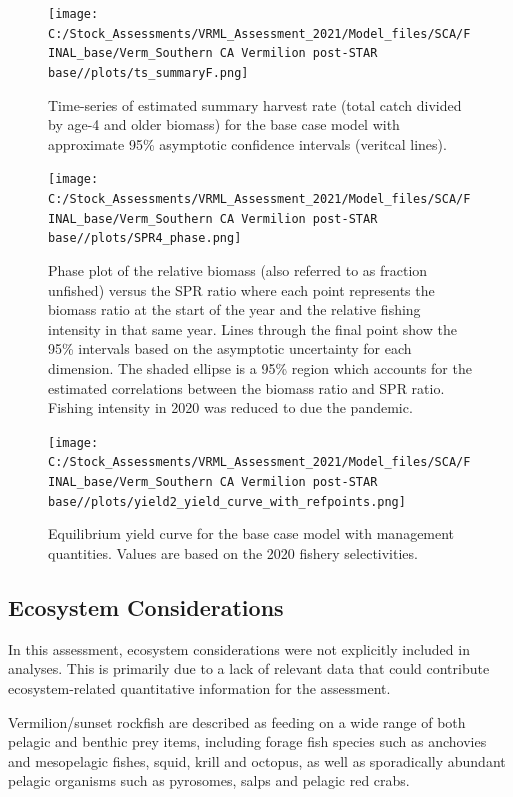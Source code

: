 \documentclass[
  english,
  a4paper,
]{article}
\begin{document}
\begin{figure}
\centering
\texttt{[image: C:/Stock\_Assessments/VRML\_Assessment\_2021/Model\_files/SCA/FINAL\_base/Verm\_Southern CA Vermilion post-STAR base//plots/ts\_summaryF.png]}
\caption{Time-series of estimated summary harvest rate (total catch divided by age-4 and older biomass) for the base case model with approximate 95\% asymptotic confidence intervals (veritcal lines).\label{fig:FmortalityES}}
\end{figure}

\begin{figure}
\centering
\texttt{[image: C:/Stock\_Assessments/VRML\_Assessment\_2021/Model\_files/SCA/FINAL\_base/Verm\_Southern CA Vermilion post-STAR base//plots/SPR4\_phase.png]}
\caption{Phase plot of the relative biomass (also referred to as fraction unfished) versus the SPR ratio where each point represents the biomass ratio at the start of the year and the relative fishing intensity in that same year. Lines through the final point show the 95\% intervals based on the asymptotic uncertainty for each dimension. The shaded ellipse is a 95\% region which accounts for the estimated correlations between the biomass ratio and SPR ratio. Fishing intensity in 2020 was reduced to due the pandemic.\label{fig:phaseES}}
\end{figure}

\begin{figure}
\centering
\texttt{[image: C:/Stock\_Assessments/VRML\_Assessment\_2021/Model\_files/SCA/FINAL\_base/Verm\_Southern CA Vermilion post-STAR base//plots/yield2\_yield\_curve\_with\_refpoints.png]}
\caption{Equilibrium yield curve for the base case model with management quantities. Values are based on the 2020
fishery selectivities.\label{fig:yield2ES}}
\end{figure}

\FloatBarrier

\hypertarget{ecosystem-considerations}{%
\subsection*{Ecosystem Considerations}\label{ecosystem-considerations}}

In this assessment, ecosystem considerations were not explicitly included in analyses.
This is primarily due to a lack of relevant data that could contribute ecosystem-related quantitative information for the assessment.

Vermilion/sunset rockfish are described as feeding on a wide range of both
pelagic and benthic prey items, including forage fish species such as anchovies
and mesopelagic fishes, squid, krill and octopus, as well as sporadically abundant
pelagic organisms such as pyrosomes, salps and pelagic red crabs.
\end{document}
